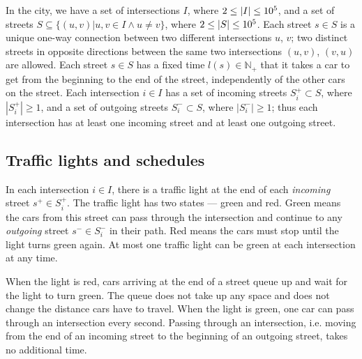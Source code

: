 In the city, we have a set of intersections
$I$, where $2 \leq \left|{I}\right| \leq 10^5$,
and a set of streets
$S \subseteq \{(u, v) | u,v \in I \land u \neq v\}$, where $2 \leq \left|{S}\right| \leq 10^5$.
Each street $s \in S$ is a unique one-way connection between two different intersections $u$, $v$; two distinct streets in opposite directions between the same two intersections $(u, v)$, $(v, u)$ are allowed. Each street $s \in S$ has a fixed time $l(s) \in \mathbb{N}_+$ that it takes a car to get from the beginning to the end of the street, independently of the other cars on the street.
Each intersection $i \in I$ has a set of incoming streets $S_i^+ \subset S$, where $|S_i^+| \geq 1$, and a set of outgoing streets $S_i^- \subset S$, where $|S_i^-| \geq 1$; thus each intersection has at least one incoming street and at least one outgoing street.

\subsection{Traffic lights and schedules}


In each intersection $i \in I$, there is a traffic light at the end of each \textit{incoming} street $s^+ \in S_i^+$. The traffic light has two states --- green and red. Green means the cars from this street can pass through the intersection and continue to any \textit{outgoing} street $s^- \in S_i^-$ in their path. Red means the cars must stop until the light turns green again. At most one traffic light can be green at each intersection at any time.


When the light is red, cars arriving at the end of a street queue up and wait for the light to turn green. The queue does not take up any space and does not change the distance cars have to travel. When the light is green, one car can pass through an intersection every second. Passing through an intersection, i.e. moving from the end of an incoming street to the beginning of an outgoing street, takes no additional time.


